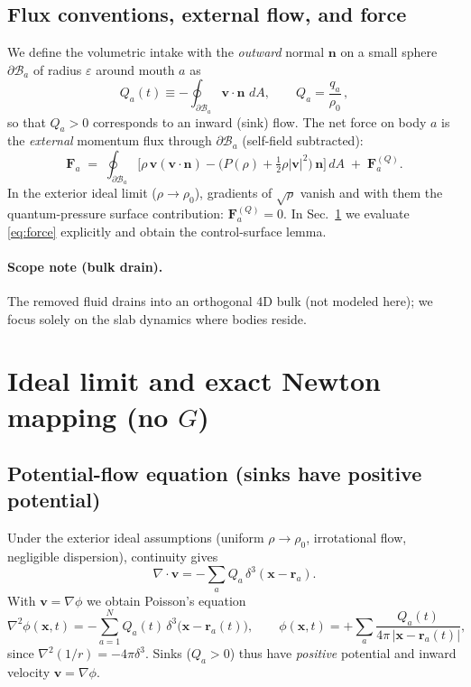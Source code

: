 \documentclass[11pt]{article}
\numberwithin{equation}{section}
\theoremstyle{plain}
\theoremstyle{remark}
\theoremstyle{definition}
\begin{document}
\subsection{Flux conventions, external flow, and force}
\label{sec:flux}
We define the volumetric intake with the \emph{outward} normal $\mathbf n$ on a small sphere $\partial\mathcal B_a$ of radius $\varepsilon$ around mouth $a$ as
\begin{equation}
Q_a(t)\equiv -\oint_{\partial\mathcal B_a}\mathbf v\!\cdot \mathbf n\,\,dA,
\qquad Q_a=\frac{q_a}{\rho_0}\,,
\label{eq:Qdef}
\end{equation}
so that $Q_a>0$ corresponds to an inward (sink) flow. The net force on body $a$ is the \emph{external} momentum flux through $\partial\mathcal B_a$ (self-field subtracted):
\begin{equation}
\mathbf F_a \;=\; \oint_{\partial\mathcal B_a}
\Big[\rho\,\mathbf v(\mathbf v\!\cdot\!\mathbf n) - \big(P(\rho)+\tfrac12\rho|\mathbf v|^2\big)\,\mathbf n\Big]\,dA \;+\; \mathbf F_a^{(Q)}.
\label{eq:force}
\end{equation}
In the exterior ideal limit ($\rho\to\rho_0$), gradients of $\sqrt\rho$ vanish and with them the quantum-pressure surface contribution: $\mathbf F^{(Q)}_a=0$. In Sec.~\ref{sec:ideal} we evaluate \eqref{eq:force} explicitly and obtain the control-surface lemma.

\paragraph{Scope note (bulk drain).}
The removed fluid drains into an orthogonal 4D bulk (not modeled here); we focus solely on the slab dynamics where bodies reside.

\section{Ideal limit and exact Newton mapping (no $G$)}
\label{sec:ideal}

\subsection{Potential-flow equation (sinks have positive potential)}
Under the exterior ideal assumptions (uniform $\rho\to\rho_0$, irrotational flow, negligible dispersion), continuity gives
\begin{equation}
\nabla\!\cdot \mathbf v = -\sum_a Q_a\,\delta^3(\mathbf x-\mathbf r_a).
\label{eq:divv}
\end{equation}
With $\mathbf v=\nabla\phi$ we obtain Poisson's equation
\begin{equation}
\nabla^2 \phi(\mathbf x,t) = -\sum_{a=1}^N Q_a(t)\,\delta^3\!\big(\mathbf x-\mathbf r_a(t)\big),
\qquad
\phi(\mathbf x,t) = +\sum_a \frac{Q_a(t)}{4\pi\,|\mathbf x-\mathbf r_a(t)|},
\label{eq:poisson}
\end{equation}
since $\nabla^2(1/r)=-4\pi\delta^3$. Sinks ($Q_a>0$) thus have \emph{positive} potential and inward velocity $\mathbf v=\nabla\phi$.
\end{document}
